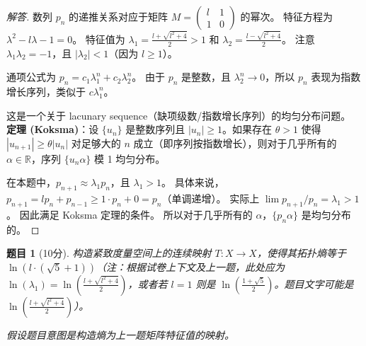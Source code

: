 \documentclass[a4paper,12pt]{article}
\newtheorem{problem}{题目}
\newenvironment{solution}{\begin{proof}[解答]}{\end{proof}}
\begin{document}
\begin{solution}
    数列 $p_n$ 的递推关系对应于矩阵 $M = \begin{pmatrix} l & 1 \\ 1 & 0 \end{pmatrix}$ 的幂次。
    特征方程为 $\lambda^2 - l\lambda - 1 = 0$。
    特征值为 $\lambda_1 = \frac{l + \sqrt{l^2+4}}{2} > 1$ 和 $\lambda_2 = \frac{l - \sqrt{l^2+4}}{2}$。
    注意 $\lambda_1 \lambda_2 = -1$，且 $|\lambda_2| < 1$（因为 $l \ge 1$）。
    
    通项公式为 $p_n = c_1 \lambda_1^n + c_2 \lambda_2^n$。
    由于 $p_n$ 是整数，且 $\lambda_2^n \to 0$，所以 $p_n$ 表现为指数增长序列，类似于 $c \lambda_1^n$。
    
    这是一个关于 lacunary sequence（缺项级数/指数增长序列）的均匀分布问题。
    \textbf{定理 (Koksma)}：设 $\{u_n\}$ 是整数序列且 $|u_n| \ge 1$。如果存在 $\theta > 1$ 使得 $|u_{n+1}| \ge \theta |u_n|$ 对足够大的 $n$ 成立（即序列按指数增长），则对于几乎所有的 $\alpha \in \mathbb{R}$，序列 $\{u_n \alpha\}$ 模 1 均匀分布。
    
    在本题中，$p_{n+1} \approx \lambda_1 p_n$，且 $\lambda_1 > 1$。
    具体来说，$p_{n+1} = l p_n + p_{n-1} \ge 1 \cdot p_n + 0 = p_n$（单调递增）。
    实际上 $\lim p_{n+1}/p_n = \lambda_1 > 1$。
    因此满足 Koksma 定理的条件。
    所以对于几乎所有的 $\alpha$，$\{p_n \alpha\}$ 是均匀分布的。
\end{solution}

\begin{problem}[10分]
    构造紧致度量空间上的连续映射 $T: X \to X$，使得其拓扑熵等于 $\ln(l \cdot (\sqrt{5}+1))$（注：根据试卷上下文及上一题，此处应为 $\ln(\lambda_1) = \ln(\frac{l+\sqrt{l^2+4}}{2})$，或者若 $l=1$ 则是 $\ln(\frac{1+\sqrt{5}}{2})$。题目文字可能是 $\ln(\frac{l+\sqrt{l^2+4}}{2})$）。
    
    \textit{假设题目意图是构造熵为上一题矩阵特征值的映射。}
\end{problem}
\end{document}
